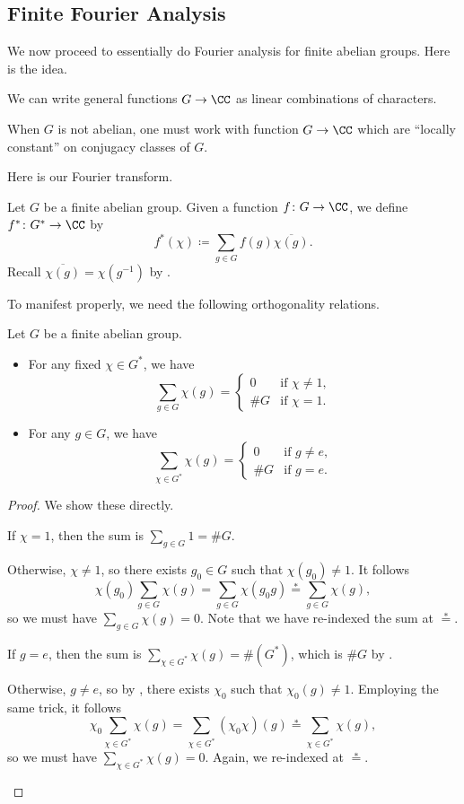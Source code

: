\documentclass[../notes.tex]{subfiles}
\begin{document}
\subsection{Finite Fourier Analysis}
We now proceed to essentially do Fourier analysis for finite abelian groups. Here is the idea.
\begin{idea} \label{idea:rep-theory}
	We can write general functions $G\to\CC$ as linear combinations of characters.
\end{idea}
\begin{remark}
	When $G$ is not abelian, one must work with function $G\to\CC$ which are ``locally constant'' on conjugacy classes of $G$.
\end{remark}
Here is our Fourier transform.
\begin{notation}
	Let $G$ be a finite abelian group. Given a function $f\colon G\to\CC$, we define $f^*\colon G^*\to\CC$ by
	\[f^*(\chi)\coloneqq\sum_{g\in G}f(g)\overline{\chi(g)}.\]
	Recall $\overline{\chi(g)}=\chi\left(g^{-1}\right)$ by .
\end{notation}
To manifest  properly, we need the following orthogonality relations.
\begin{proposition} \label{prop:ortho-relations}
	Let $G$ be a finite abelian group.
	\begin{itemize}
		\item For any fixed $\chi\in G^*$, we have
		\[\sum_{g\in G}\chi(g)=\begin{cases}
			0 & \text{if }\chi\ne1, \\
			\#G & \text{if }\chi=1.
		\end{cases}\]
		\item For any $g\in G$, we have
		\[\sum_{\chi\in G^*}\chi(g)=\begin{cases}
			0 & \text{if }g\ne e, \\
			\#G & \text{if }g=e.
		\end{cases}\]
	\end{itemize}
\end{proposition}
\begin{proof}
	We show these directly.
	\begin{listalph}
		\item If $\chi=1$, then the sum is $\sum_{g\in G}1=\#G$.
		
		Otherwise, $\chi\ne1$, so there exists $g_0\in G$ such that $\chi(g_0)\ne1$. It follows
		\[\chi(g_0)\sum_{g\in G}\chi(g)=\sum_{g\in G}\chi(g_0g)\stackrel*=\sum_{g\in G}\chi(g),\]
		so we must have $\sum_{g\in G}\chi(g)=0$. Note that we have re-indexed the sum at $\stackrel*=$.
		\item If $g=e$, then the sum is $\sum_{\chi\in G^*}\chi(g)=\#(G^*)$, which is $\#G$ by .

		Otherwise, $g\ne e$, so by , there exists $\chi_0$ such that $\chi_0(g)\ne1$. Employing the same trick, it follows
		\[\chi_0\sum_{\chi\in G^*}\chi(g)=\sum_{\chi\in G^*}(\chi_0\chi)(g)\stackrel*=\sum_{\chi\in G^*}\chi(g),\]
		so we must have $\sum_{\chi\in G^*}\chi(g)=0$. Again, we re-indexed at $\stackrel*=$.
		\qedhere
	\end{listalph}
\end{proof}
\end{document}
